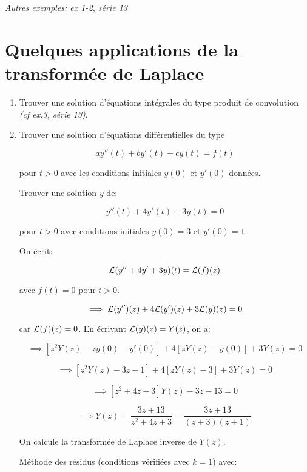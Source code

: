 \textit{Autres exemples: ex 1-2, série 13}


\section{Quelques applications de la transformée de Laplace}

\begin{enumerate}[label=\alph{enumi})]
    \item 
    Trouver une solution d'équations intégrales du type produit de convolution \textit{(cf ex.3, série 13)}.
    
    \item 
    Trouver une solution d'équations différentielles du type
    
    \[ a y''(t) + b y'(t) + c y(t) = f(t) \]
    
    pour $t > 0$ avec les conditions initiales $y(0)$ et $y'(0)$ données.
    
    \begin{example}
        Trouver une solution $y$ de:
        
        \[ y''(t) + 4 y'(t) + 3 y(t) = 0 \]
        
        pour $t > 0$ avec conditions initiales $y(0) = 3$ et $y'(0) = 1$.
        
        On écrit:
        
        \[ \mathcal{L}(y'' + 4 y' + 3 y)(t) = \mathcal{L}(f)(z) \]
        
        avec $f(t) = 0$ pour $t > 0$.
        
        \[ \implies \mathcal{L}(y'')(z) + 4 \mathcal{L}(y')(z) + 3 \mathcal{L}(y)(z) = 0 \]
        
        car $\mathcal{L}(f)(z) = 0$.
        En écrivant $\mathcal{L}(y)(z) = Y(z)$, on a:
        
        \[ \implies \left[ z^2 Y(z) - z y(0) - y'(0) \right] + 4 \left[ z Y(z) - y(0) \right] + 3 Y(z) = 0 \]
        
        \[ \implies \left[ z^2 Y(z) - 3z - 1 \right] + 4 \left[ z Y(z) - 3 \right] + 3 Y(z) = 0 \]
        
        \[ \implies \left[ z^2 + 4z + 3 \right] Y(z) - 3z - 13 = 0 \]
        
        \[ \implies Y(z) = \frac{3z + 13}{z^2 + 4z + 3} = \frac{3z + 13}{(z+3)(z+1)} \]
        
        On calcule la transformée de Laplace inverse de $Y(z)$.
        
        Méthode des résidus (conditions vérifiées avec $k = 1$) avec:
        

\end{example}
\end{enumerate}
